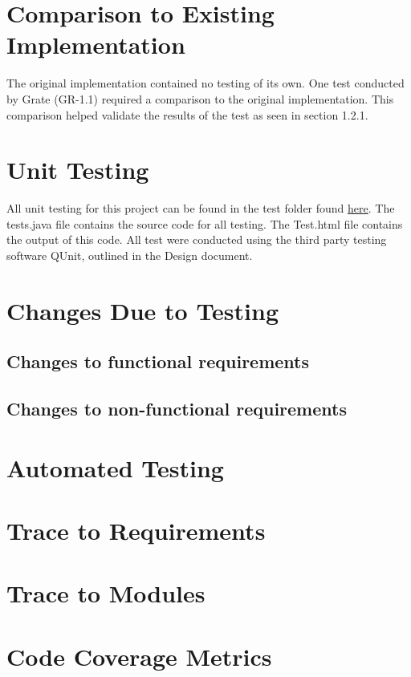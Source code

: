 \documentclass[12pt, titlepage]{article}
\begin{document}
\section{Comparison to Existing Implementation}

The original implementation contained no testing of its own. One test conducted by Grate (GR-1.1) required a comparison to the original implementation. This comparison helped validate the results of the test as seen in section 1.2.1.

\section{Unit Testing}

All unit testing for this project can be found in the test folder found \href{https://gitlab.cas.mcmaster.ca/linkk4/GrateBox/tree/master/src/test}{here}. The tests.java file contains the source code for all testing. The Test.html file contains the output of this code. All test were conducted using the third party testing software QUnit, outlined in the Design document.

\section{Changes Due to Testing}

\subsection{Changes to functional requirements}

\subsection{Changes to non-functional requirements}

\section{Automated Testing}
		
\section{Trace to Requirements}
		
\section{Trace to Modules}		

\section{Code Coverage Metrics}
\end{document}

